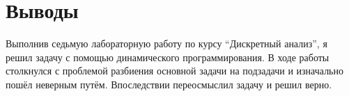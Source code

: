 \section{Выводы}
Выполнив седьмую лабораторную работу по курсу \enquote{Дискретный анализ}, я решил задачу с помощью динамического программирования. В ходе работы
столкнулся с проблемой разбиения основной задачи на подзадачи и изначально пошёл неверным путём. Впоследствии переосмыслил задачу и решил верно.
\pagebreak
